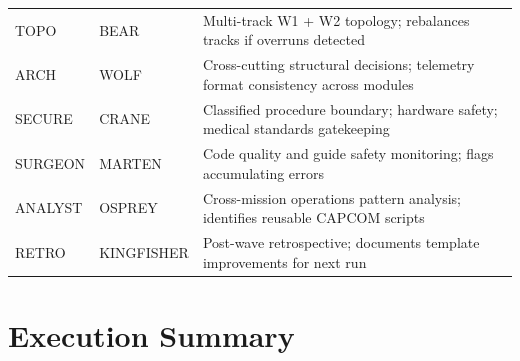 \documentclass[11pt,letterpaper]{article}
\begin{document}
\begin{center}
\begin{tabularx}{\textwidth}{L{2.5cm}L{2.8cm}X}
TOPO & BEAR & Multi-track W1 + W2 topology; rebalances tracks if overruns detected \\
ARCH & WOLF & Cross-cutting structural decisions; telemetry format consistency across modules \\
SECURE & CRANE & Classified procedure boundary; hardware safety; medical standards gatekeeping \\
SURGEON & MARTEN & Code quality and guide safety monitoring; flags accumulating errors \\
ANALYST & OSPREY & Cross-mission operations pattern analysis; identifies reusable CAPCOM scripts \\
RETRO & KINGFISHER & Post-wave retrospective; documents template improvements for next run \\
\bottomrule
\end{tabularx}
\end{center}

\section{Execution Summary}
\end{document}
